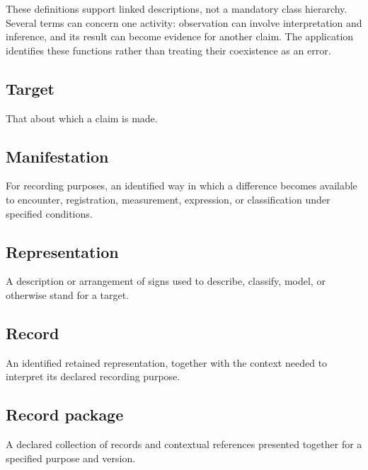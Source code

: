 \documentclass[11pt,a4paper]{article}
\begin{document}
These definitions support linked descriptions, not a mandatory class hierarchy. Several terms can concern one activity: observation can involve interpretation and inference, and its result can become evidence for another claim. The application identifies these functions rather than treating their coexistence as an error.

\subsection{Target}
That about which a claim is made.

\subsection{Manifestation}
For recording purposes, an identified way in which a difference becomes available to encounter, registration, measurement, expression, or classification under specified conditions.

\subsection{Representation}
A description or arrangement of signs used to describe, classify, model, or otherwise stand for a target.

\subsection{Record}
An identified retained representation, together with the context needed to interpret its declared recording purpose.

\subsection{Record package}
A declared collection of records and contextual references presented together for a specified purpose and version.
\end{document}
